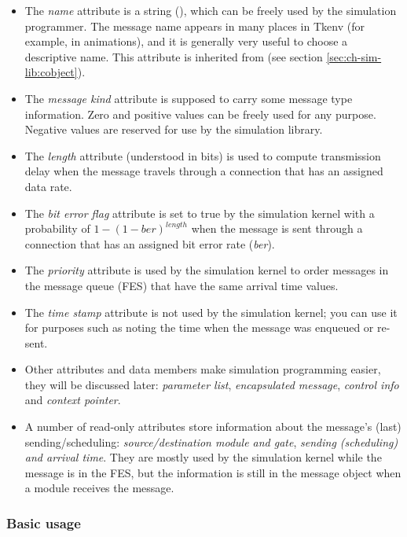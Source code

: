 \begin{itemize}
  \item{The \textit{name} attribute is a string (),
    which can be freely used by the simulation programmer. The message
    name appears in many places in Tkenv (for example, in animations),
    and it is generally very useful to choose a descriptive name.
    This attribute is inherited from  (see section
    \ref{sec:ch-sim-lib:cobject}).}
  \item{The \textit{message kind} attribute is supposed to carry some message
    type information. Zero and positive values can be freely used
    for any purpose. Negative values are reserved for use by the
    {\opp} simulation library.}
  \item{The \textit{length} attribute (understood in bits) is used to compute
    transmission delay when the message travels through a connection
    that has an assigned data rate.}
  \item{The \textit{bit error flag} attribute is set to true by the simulation
    kernel with a probability of $1-(1-\textit{ber})^{\mathit{length}}$ when the
    message is sent through a connection that has an assigned bit
    error rate (\textit{ber}).}
  \item{The \textit{priority} attribute is used by the simulation kernel to
    order messages in the message queue (FES) that have the same
    arrival time values.}
  \item{The \textit{time stamp} attribute is not used by the simulation kernel;
    you can use it for purposes such as noting the time when the
    message was enqueued or re-sent.}
  \item{Other attributes and data members make simulation programming
    easier, they will be discussed later: \textit{parameter list}, \textit{encapsulated
      message}, \textit{control info} and \textit{context pointer}.}
  \item{A number of read-only attributes store information about the
    message's (last) sending/scheduling: \textit{source/destination module
      and gate}, \textit{sending (scheduling) and arrival time}. They are
    mostly used by the simulation kernel while the message is in
    the FES, but the information is still in the message object when
    a module receives the message.}
\end{itemize}


\subsubsection{Basic usage}


